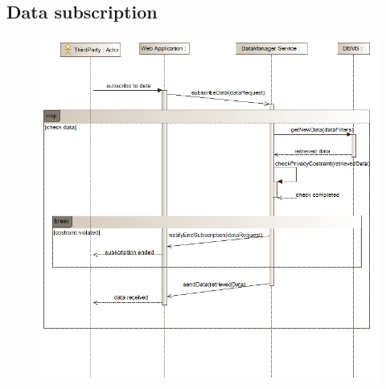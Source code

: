 \subsection{Data subscription}
\begin{figure}[h]
\centering
\includegraphics[width=\linewidth]{resources/uml/sequence/DataSubscription.png}
\end{figure}

















